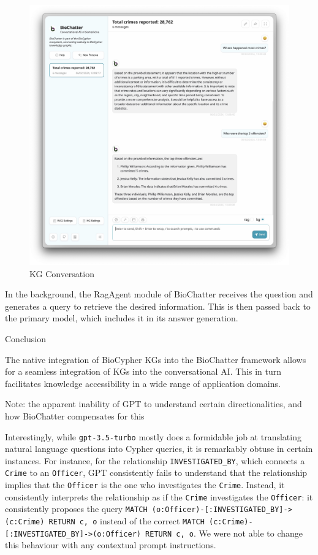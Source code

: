 \begin{fignos:no-prefix-figure-caption}

\begin{figure}
\centering
\includegraphics{images/kg-demo.png}
\caption{KG Conversation}
\end{figure}

\end{fignos:no-prefix-figure-caption}

In the background, the RagAgent module of BioChatter receives the question and
generates a query to retrieve the desired information. This is then passed back
to the primary model, which includes it in its answer generation.

Conclusion

The native integration of BioCypher KGs into the BioChatter framework allows for
a seamless integration of KGs into the conversational AI. This in turn
facilitates knowledge accessibility in a wide range of application domains.

Note: the apparent inability of GPT to understand certain directionalities, and how BioChatter compensates for this

Interestingly, while \texttt{gpt-3.5-turbo} mostly does a formidable job at translating
natural language questions into Cypher queries, it is remarkably obtuse in
certain instances. For instance, for the relationship \texttt{INVESTIGATED\_BY}, which
connects a \texttt{Crime} to an \texttt{Officer}, GPT consistently fails to understand that
the relationship implies that the \texttt{Officer} is the one who investigates the
\texttt{Crime}. Instead, it consistently interprets the relationship as if the \texttt{Crime}
investigates the \texttt{Officer}: it consistently proposes the query \texttt{MATCH\ (o:Officer)-{[}:INVESTIGATED\_BY{]}-\textgreater{}(c:Crime)\ RETURN\ c,\ o} instead of the correct
\texttt{MATCH\ (c:Crime)-{[}:INVESTIGATED\_BY{]}-\textgreater{}(o:Officer)\ RETURN\ c,\ o}. We were not able
to change this behaviour with any contextual prompt instructions.

